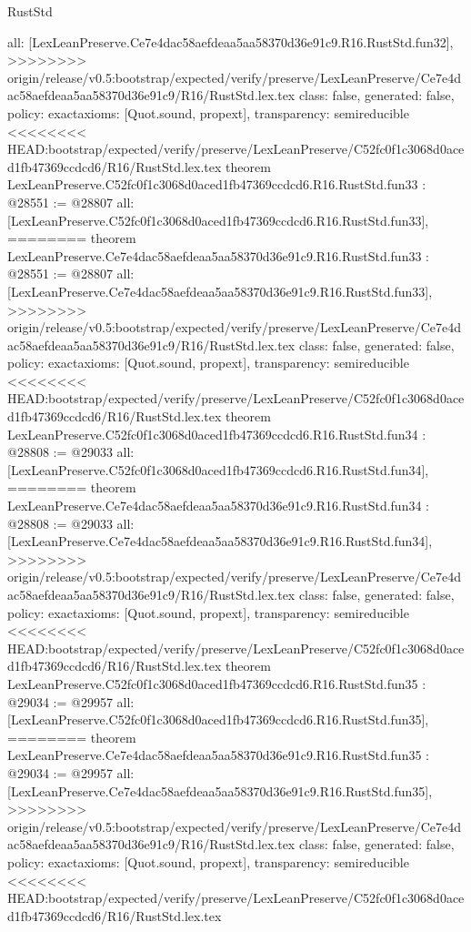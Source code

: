 \begin{lexlean}{RustStd}
\begin{coremodule}
{\begin{coremodule}
{{{{{{{{{{{{{{{{{{{{{{{{{{{{{{{{{{{{  all: [LexLeanPreserve.Ce7e4dac58aefdeaa5aa58370d36e91c9.R16.RustStd.fun32],
>>>>>>>> origin/release/v0.5:bootstrap/expected/verify/preserve/LexLeanPreserve/Ce7e4dac58aefdeaa5aa58370d36e91c9/R16/RustStd.lex.tex
  class: false,
  generated: false,
  policy: exact{axioms: [Quot.sound, propext]},
  transparency: semireducible
}
<<<<<<<< HEAD:bootstrap/expected/verify/preserve/LexLeanPreserve/C52fc0f1c3068d0aced1fb47369ccdcd6/R16/RustStd.lex.tex
theorem LexLeanPreserve.C52fc0f1c3068d0aced1fb47369ccdcd6.R16.RustStd.fun33 : @28551 := @28807 {
  all: [LexLeanPreserve.C52fc0f1c3068d0aced1fb47369ccdcd6.R16.RustStd.fun33],
========
theorem LexLeanPreserve.Ce7e4dac58aefdeaa5aa58370d36e91c9.R16.RustStd.fun33 : @28551 := @28807 {
  all: [LexLeanPreserve.Ce7e4dac58aefdeaa5aa58370d36e91c9.R16.RustStd.fun33],
>>>>>>>> origin/release/v0.5:bootstrap/expected/verify/preserve/LexLeanPreserve/Ce7e4dac58aefdeaa5aa58370d36e91c9/R16/RustStd.lex.tex
  class: false,
  generated: false,
  policy: exact{axioms: [Quot.sound, propext]},
  transparency: semireducible
}
<<<<<<<< HEAD:bootstrap/expected/verify/preserve/LexLeanPreserve/C52fc0f1c3068d0aced1fb47369ccdcd6/R16/RustStd.lex.tex
theorem LexLeanPreserve.C52fc0f1c3068d0aced1fb47369ccdcd6.R16.RustStd.fun34 : @28808 := @29033 {
  all: [LexLeanPreserve.C52fc0f1c3068d0aced1fb47369ccdcd6.R16.RustStd.fun34],
========
theorem LexLeanPreserve.Ce7e4dac58aefdeaa5aa58370d36e91c9.R16.RustStd.fun34 : @28808 := @29033 {
  all: [LexLeanPreserve.Ce7e4dac58aefdeaa5aa58370d36e91c9.R16.RustStd.fun34],
>>>>>>>> origin/release/v0.5:bootstrap/expected/verify/preserve/LexLeanPreserve/Ce7e4dac58aefdeaa5aa58370d36e91c9/R16/RustStd.lex.tex
  class: false,
  generated: false,
  policy: exact{axioms: [Quot.sound, propext]},
  transparency: semireducible
}
<<<<<<<< HEAD:bootstrap/expected/verify/preserve/LexLeanPreserve/C52fc0f1c3068d0aced1fb47369ccdcd6/R16/RustStd.lex.tex
theorem LexLeanPreserve.C52fc0f1c3068d0aced1fb47369ccdcd6.R16.RustStd.fun35 : @29034 := @29957 {
  all: [LexLeanPreserve.C52fc0f1c3068d0aced1fb47369ccdcd6.R16.RustStd.fun35],
========
theorem LexLeanPreserve.Ce7e4dac58aefdeaa5aa58370d36e91c9.R16.RustStd.fun35 : @29034 := @29957 {
  all: [LexLeanPreserve.Ce7e4dac58aefdeaa5aa58370d36e91c9.R16.RustStd.fun35],
>>>>>>>> origin/release/v0.5:bootstrap/expected/verify/preserve/LexLeanPreserve/Ce7e4dac58aefdeaa5aa58370d36e91c9/R16/RustStd.lex.tex
  class: false,
  generated: false,
  policy: exact{axioms: [Quot.sound, propext]},
  transparency: semireducible
}
<<<<<<<< HEAD:bootstrap/expected/verify/preserve/LexLeanPreserve/C52fc0f1c3068d0aced1fb47369ccdcd6/R16/RustStd.lex.tex
}}}}}}}}}}}}}}}}}}}}}}}}}}}}}}}}}}}}}}
\end{coremodule}}
\end{coremodule}
\end{lexlean}
